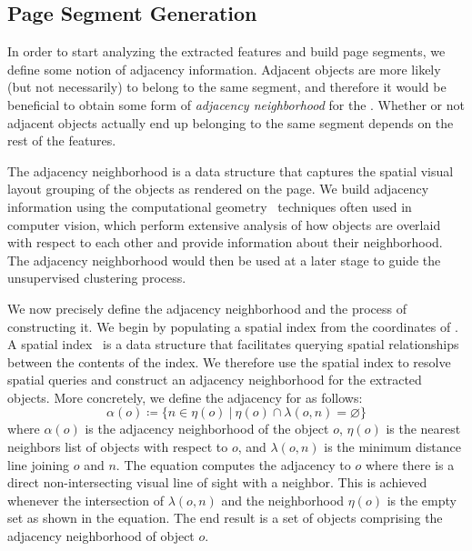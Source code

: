 \subsection{Page Segment Generation}

In order to start analyzing the extracted {\vizobjs} features
and build page segments, we define some notion of 
adjacency information.
Adjacent objects are more likely (but not necessarily) to belong
to the same segment, and therefore it would be beneficial
to obtain some form of \emph{adjacency neighborhood} for 
the \vizobjs.
Whether or not adjacent objects actually
end up belonging to the same segment depends on the rest of the features.

The adjacency neighborhood is a data structure that captures the spatial visual layout grouping 
of the objects as rendered on the page. 
We build adjacency information using the computational geometry~\cite{toth2017handbook}
techniques often used in computer vision, which perform extensive analysis 
of how objects are overlaid with respect to each other and provide
information about their neighborhood.
The adjacency neighborhood would then be used at a later stage
to guide the unsupervised clustering process.


We now precisely define the adjacency neighborhood 
and the process of constructing it.
We begin by populating a spatial index from the coordinates
of {\vizobjs}.
A spatial index~\cite{beckmann1990r}
is a data structure that facilitates querying spatial relationships
between the contents of the index.
We therefore use the spatial index to resolve spatial queries and
construct an adjacency neighborhood for the extracted objects.
More concretely, we define the adjacency for {\vizobjs} as follows:
\begin{equation}
\alpha(o) \coloneqq \{ n \in \eta(o) \:\vert\: \eta(o) \cap \lambda(o, n) = \varnothing \}
\end{equation}
where $\alpha(o)$ is the adjacency neighborhood of the object $o$,
$\eta(o)$ is the nearest neighbors list of objects with respect to $o$,
and $\lambda(o, n)$ is the minimum distance line joining $o$ and $n$.
The equation computes the adjacency to $o$
where there is a direct non-intersecting 
visual line of sight with a neighbor.
This is achieved whenever the intersection of $\lambda(o, n)$
and the neighborhood $\eta(o)$ is the empty set as shown in the equation.
The end result is a set of objects comprising the
adjacency neighborhood of object $o$.


